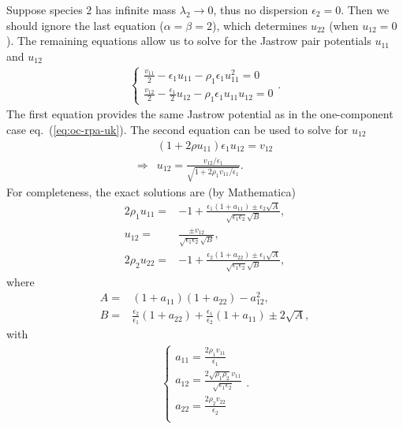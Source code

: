 Suppose species $2$ has infinite mass $\lambda_2\rightarrow0$, thus no dispersion $\epsilon_2=0$. Then we should ignore the last equation ($\alpha=\beta=2$), which determines $u_{22}$ (when $u_{12}=0$). The remaining equations allow us to solve for the Jastrow pair potentials $u_{11}$ and $u_{12}$
\begin{align}
\left\{\begin{array}{l}
\frac{v_{11}}{2} - \epsilon_1 u_{11} - \rho_1\epsilon_1u_{11}^2 = 0 \\
\frac{v_{12}}{2} - \frac{\epsilon_1}{2} u_{12} - \rho_1\epsilon_1u_{11}u_{12} = 0
\end{array}\right..
\end{align}
The first equation provides the same Jastrow potential as in the one-component case eq.~(\ref{eq:oc-rpa-uk}). The second equation can be used to solve for $u_{12}$
\begin{align}
&(1+2\rho u_{11}) \epsilon_1 u_{12} = v_{12} \nonumber \\
\Rightarrow & u_{12} = \frac{v_{12}/\epsilon_1}{\sqrt{1+2\rho_1v_{11}/\epsilon_1}}.
\end{align}
For completeness, the exact solutions are (by Mathematica)
\begin{align}
2\rho_1u_{11} =& -1+\frac{\epsilon_1(1+a_{11}) \pm \epsilon_2\sqrt{A}}
{
\sqrt{\epsilon_1\epsilon_2}\sqrt{B}
},\\
u_{12} =& \frac{\pm v_{12} }{
\sqrt{\epsilon_1\epsilon_2}\sqrt{B}
},\\
2\rho_2u_{22} =& -1+\frac{\epsilon_2(1+a_{22}) \pm \epsilon_1\sqrt{A}}
{
\sqrt{\epsilon_1\epsilon_2}\sqrt{B}
},
\end{align}
where 
\begin{align}
A =& (1+a_{11})(1+a_{22})-a_{12}^2,\\
B =&\frac{\epsilon_2}{\epsilon_1}(1+a_{22}) + \frac{\epsilon_1}{\epsilon_2}(1+a_{11}) \pm 2\sqrt{A},
\end{align}
with
\begin{align}
\left\{\begin{array}{l}
a_{11}=\frac{2\rho_1v_{11}}{\epsilon_1} \\
a_{12}=\frac{2\sqrt{\rho_1\rho_2}v_{11}}{\sqrt{\epsilon_1\epsilon_2}} \\
a_{22}=\frac{2\rho_2v_{22}}{\epsilon_2} \\
\end{array}\right..
\end{align}